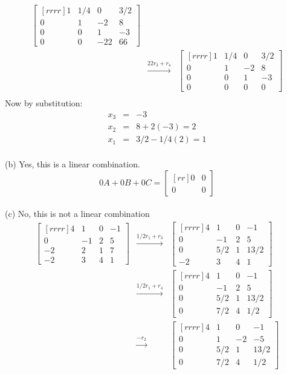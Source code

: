 \begin{solution}
\begin{eqnarray*}
\begin{bmatrix}[rrrr]
1&1/4&0&3/2\\
0&1&-2&8\\
0&0&1&-3\\
0&0&-22&66
\end{bmatrix}\\
&\xrightarrow[]{22r_3+r_4}&
\begin{bmatrix}[rrrr]
1&1/4&0&3/2\\
0&1&-2&8\\
0&0&1&-3\\
0&0&0&0
\end{bmatrix}\\
\end{eqnarray*}
Now by substitution:
\begin{eqnarray*}
x_3 &=& -3\\ 
x_2 &=& 8 +2(-3) = 2\\
x_1 &=& 3/2 - 1/4(2) = 1
\end{eqnarray*}
\ \\
(b) Yes, this is a linear combination.
$$
0A + 0B +0C = \begin{bmatrix}[rr]
0&0\\
0&0
\end{bmatrix}
$$
\ \\
(c) No, this is not a linear combination
\begin{eqnarray*}
\begin{bmatrix}[rrrr]
4&1&0&-1\\
0&-1&2&5\\
-2&2&1&7\\
-2&3&4&1
\end{bmatrix}
&\xrightarrow[]{1/2r_1+r_3}&
\begin{bmatrix}[rrrr]
4&1&0&-1\\
0&-1&2&5\\
0&5/2&1&13/2\\
-2&3&4&1
\end{bmatrix}\\
&\xrightarrow[]{1/2r_1+r_4}&
\begin{bmatrix}[rrrr]
4&1&0&-1\\
0&-1&2&5\\
0&5/2&1&13/2\\
0&7/2&4&1/2
\end{bmatrix}\\
&\xrightarrow[]{-r_2}&
\begin{bmatrix}[rrrr]
4&1&0&-1\\
0&1&-2&-5\\
0&5/2&1&13/2\\
0&7/2&4&1/2

\end{bmatrix}
\end{eqnarray*}
\end{solution}
